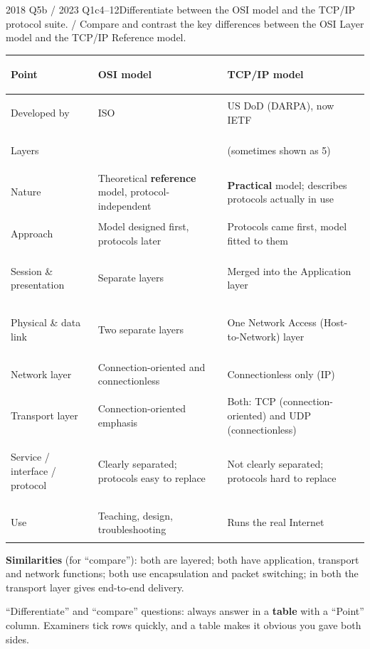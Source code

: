 \documentclass[10pt]{article}
\begin{document}
\begin{pastq}{2018 Q5b \textnormal{/} 2023 Q1c}{4--12}Differentiate between the OSI model and the TCP/IP protocol suite. / Compare and contrast the key differences between the OSI Layer model and the TCP/IP Reference model.\end{pastq}
\begin{ans}
\small
\begin{tabularx}{\linewidth}{@{}>{\bfseries\raggedright\arraybackslash}p{2.3cm}>{\raggedright\arraybackslash}X>{\raggedright\arraybackslash}X@{}}
\toprule
Point & OSI model & TCP/IP model\\\midrule
Developed by & ISO & US DoD (DARPA), now IETF\\
Layers & 7 & 4 (sometimes shown as 5)\\
Nature & Theoretical \textbf{reference} model, protocol-independent & \textbf{Practical} model; describes protocols actually in use\\
Approach & Model designed first, protocols later & Protocols came first, model fitted to them\\
Session \& presentation & Separate layers & Merged into the Application layer\\
Physical \& data link & Two separate layers & One Network Access (Host-to-Network) layer\\
Network layer & Connection-oriented and connectionless & Connectionless only (IP)\\
Transport layer & Connection-oriented emphasis & Both: TCP (connection-oriented) and UDP (connectionless)\\
Service / interface / protocol & Clearly separated; protocols easy to replace & Not clearly separated; protocols hard to replace\\
Use & Teaching, design, troubleshooting & Runs the real Internet\\
\bottomrule
\end{tabularx}
\normalsize
\textbf{Similarities} (for ``compare''): both are layered; both have application, transport and network functions; both use encapsulation and packet switching; in both the transport layer gives end-to-end delivery.
\end{ans}

\begin{examtip}
``Differentiate'' and ``compare'' questions: always answer in a \textbf{table} with a ``Point'' column. Examiners tick rows quickly, and a table makes it obvious you gave both sides.
\end{examtip}
\end{document}
